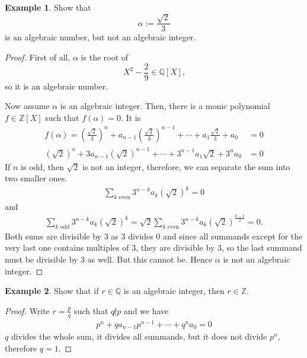 \documentclass[a4paper]{book}
\theoremstyle{definition}
\newtheorem{example}{Example}[definition]
\begin{document}
\begin{example}
    Show that
    \begin{equation*}
        \alpha := \frac{\sqrt{2}}{3}
    \end{equation*}
    is an algebraic number, but not an algebraic integer.
\end{example}
\begin{proof}
    First of all, \(\alpha\) is the root of
    \begin{equation*}
        X^2 - \frac{2}{9} \in \mathbb{Q}[X] \text{,}
    \end{equation*}
    so it is an algebraic number.

    Now assume \(\alpha\) is an algebraic integer. Then, there is a monic polynomial \(f \in \mathbb{Z}[X]\) such that \(f(\alpha) = 0\). It is
    \begin{align*}
        f(\alpha) = \left(\frac{\sqrt{2}}{3}\right)^n + a_{n-1}\left(\frac{\sqrt{2}}{3}\right)^{n - 1} + \cdots + a_1 \frac{\sqrt{2}}{3} + a_0 &= 0 \\
        (\sqrt{2})^n + 3 a_{n-1} (\sqrt{2})^{n-1} + \cdots + 3^{n-1} a_1 \sqrt{2} + 3^n a_0 &= 0
    \end{align*}
    If \(n\) is odd, then \(\sqrt{2}\) is not an integer, therefore, we can separate the sum into two smaller ones.
    \begin{align*}
        \sum_{k \text{ even}} 3^{n - k} a_k (\sqrt{2})^k = 0
    \end{align*}
    and
    \begin{align*}
        \sum_{k \text{ odd}} 3^{n - k} a_k (\sqrt{2})^k = \sqrt{2} \sum_{k \text{ even}} 3^{n - k} a_k (\sqrt{2})^{\frac{k - 1}{2}} = 0\text{.}
    \end{align*}
    Both sums are divisible by \(3\) as \(3\) divides \(0\) and since all summands except for the very last one contains multiples of \(3\), they are divisible by \(3\), so the last summand must be divisible by \(3\) as well. But this cannot be. Hence \(\alpha\) is not an algebraic integer.
\end{proof}

\begin{example}
    Show that if \(r \in \mathbb{Q}\) is an algebraic integer, then \(r \in \mathbb{Z}\).
\end{example}
\begin{proof}
    Write \(r = \frac{p}{q}\) such that \(q \not| p\) and we have
    \begin{align*}
        p^n + q a_{n-1}p^{n-1} + \cdots + q^n a_0 = 0
    \end{align*}
    \(q\) divides the whole sum, it divides all summands, but it does not divide \(p^n\), therefore \(q = 1\).
\end{proof}
\end{document}
